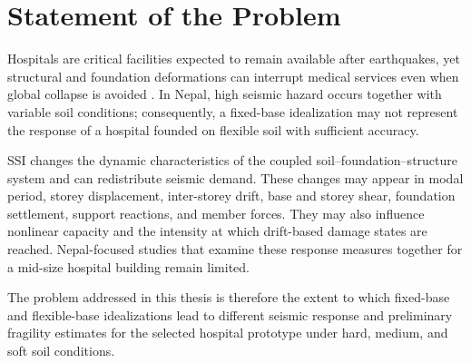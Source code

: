 \section{Statement of the Problem}
Hospitals are critical facilities expected to remain available after earthquakes, yet structural and foundation deformations can interrupt medical services even when global collapse is avoided \cite{guragain2004,subedi2022}. In Nepal, high seismic hazard occurs together with variable soil conditions; consequently, a fixed-base idealization may not represent the response of a hospital founded on flexible soil with sufficient accuracy.

SSI changes the dynamic characteristics of the coupled soil--foundation--structure system and can redistribute seismic demand. These changes may appear in modal period, storey displacement, inter-storey drift, base and storey shear, foundation settlement, support reactions, and member forces. They may also influence nonlinear capacity and the intensity at which drift-based damage states are reached. Nepal-focused studies that examine these response measures together for a mid-size hospital building remain limited.

The problem addressed in this thesis is therefore the extent to which fixed-base and flexible-base idealizations lead to different seismic response and preliminary fragility estimates for the selected hospital prototype under hard, medium, and soft soil conditions.
